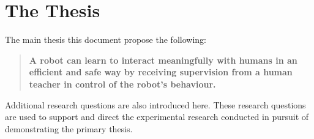 
\section{The Thesis}\label{sec:intro_thesis}
The main thesis this document propose the following:
\begin{quote}
	\textbf{A robot can learn to interact meaningfully with humans in an efficient and safe way by receiving supervision from a human teacher in control of the robot's behaviour.}
\end{quote}

Additional research questions are also introduced here. These research questions are used to support and direct the experimental research conducted in pursuit of demonstrating the primary thesis.

